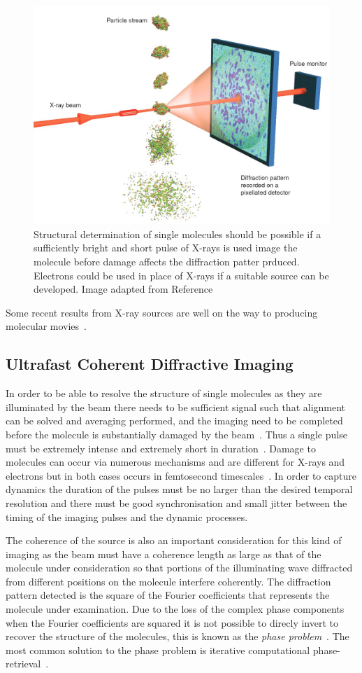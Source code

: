 \begin{figure}
    \center
    \includegraphics[width=0.65\linewidth]{0intro/Figs/single_molecule_cdi.jpg}
    \caption{Structural determination of single molecules should be possible if a sufficiently bright and short pulse of X-rays is used image the molecule before damage affects the diffraction patter prduced. Electrons could be used in place of X-rays if a suitable source can be developed. Image adapted from Reference~\cite{gaffney_imaging_2007}}
    \label{figure:molecule_cdi}
\end{figure}

Some recent results from X-ray sources are well on the way to producing molecular movies~\cite{pande_femtosecond_2016,nango_three-dimensional_2016}.

\subsection{Ultrafast Coherent Diffractive Imaging}

In order to be able to resolve the structure of single molecules as they are illuminated by the beam there needs to be sufficient signal such that alignment can be solved and averaging performed, and the imaging need to be completed before the molecule is substantially damaged by the beam~\cite{huldt_diffraction_2003}.
Thus a single pulse must be extremely intense and extremely short in duration~\cite{chapman_femtosecond_2006}.
Damage to molecules can occur via numerous mechanisms and are different for X-rays and electrons but in both cases occurs in femtosecond timescales~\cite{spence_outrunning_2017}.
In order to capture dynamics the duration of the pulses must be no larger than the desired temporal resolution and there must be good synchronisation and small jitter between the timing of the imaging pulses and the dynamic processes.


The coherence of the source is also an important consideration for this kind of imaging as the beam must have a coherence length as large as that of the molecule under consideration so that portions of the illuminating wave diffracted from different positions on the molecule interfere coherently.
The diffraction pattern detected is the square of the Fourier coefficients that represents the molecule under examination.
Due to the loss of the complex phase components when the Fourier coefficients are squared it is not possible to direcly invert to recover the structure of the molecules, this is known as the \emph{phase problem}~\cite{rodenburg_phase_1989}.
The most common solution to the phase problem is iterative computational phase-retrieval~\cite{chapman_coherent_2010}.

